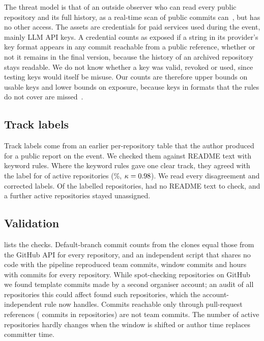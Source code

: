 \documentclass{article}
\begin{document}
The threat model is that of an outside observer who can read every public repository and its full history, as a real-time scan of public commits can~\cite{meli2019git}, but has no other access. The assets are credentials for paid services used during the event, mainly LLM API keys. A credential counts as exposed if a string in its provider's key format appears in any commit reachable from a public reference, whether or not it remains in the final version, because the history of an archived repository stays readable. We do not know whether a key was valid, revoked or used, since testing keys would itself be misuse. Our counts are therefore upper bounds on usable keys and lower bounds on exposure, because keys in formats that the rules do not cover are missed~\cite{basak2023tools}.

\subsection{Track labels}
Track labels come from an earlier per-repository table that the author produced for a public report on the event. We checked them against README text with keyword rules. Where the keyword rules gave one clear track, they agreed with the label for \NValidationTracksKwAgree{} of \NValidationTracksKwDecisive{} active repositories (\NValidationTracksKwAgreePct\%, $\kappa = \num{0.98}$). We read every disagreement and corrected \NRqOneLabelFixes{} labels. Of the labelled repositories, \NValidationTracksKwLabelledNoReadmeText{} had no README text to check, and a further \NRqOneTrackUnclear{} active repositories stayed unassigned.

\subsection{Validation}
 lists the checks. Default-branch commit counts from the clones equal those from the GitHub API for every repository, and an independent script that shares no code with the pipeline reproduced team commits, window commits and hours with commits for every repository. While spot-checking repositories on GitHub we found template commits made by a second organiser account; an audit of all \NValidationTemplateAuditN{} repositories this could affect found \NValidationTemplateFixes{} such repositories, which the account-independent rule now handles. Commits reachable only through pull-request references (\NValidationPrOnlyCommits{} commits in \NValidationPrOnlyRepos{} repositories) are not team commits. The number of active repositories hardly changes when the window is shifted or author time replaces committer time.
\end{document}
